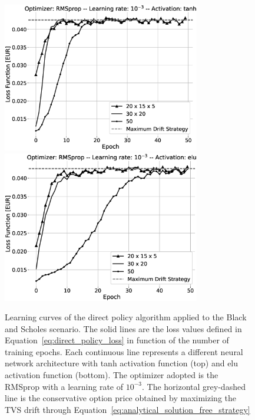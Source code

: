 \documentclass[runningheads]{m2ef}
\newcommand{\change}[1]{{\color{red} {#1}}}%
\begin{document}
 \begin{figure}[h!]
	\centering
	\includegraphics[width=3.4in]{BS_fine_tuning_RMSprop_tanh_grey.eps}
	\includegraphics[width=3.4in]{BS_fine_tuning_RMSprop_elu_grey.eps}
	\caption{Learning curves of the direct policy algorithm applied to the Black and Scholes \change{scenario}. The solid lines are the loss values defined in Equation~\eqref{eq:direct_policy_loss} in function of the number of training epochs. Each continuous line represents a different neural network architecture with tanh activation function (top) and elu activation function (bottom). The optimizer adopted is the RMSprop with a learning rate of $10^{-3}$. The horizontal grey-dashed line is the conservative option price obtained by maximizing the TVS drift through Equation~\eqref{eq:analytical_solution_free_strategy}}
	\label{fig:result_bs_rmsprop}
\end{figure}  
\end{document}
